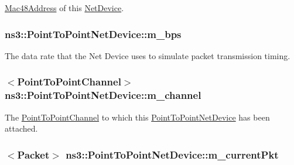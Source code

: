 \hyperlink{classns3_1_1Mac48Address}{Mac48\+Address} of this \hyperlink{classns3_1_1NetDevice}{Net\+Device}. 

\subsubsection[{\texorpdfstring{m\+\_\+bps}{m_bps}}]{ ns3\+::\+Point\+To\+Point\+Net\+Device\+::m\+\_\+bps\hspace{0.3cm}{\ttfamily [private]}}\hypertarget{classns3_1_1PointToPointNetDevice_a188a0f39b73b58cd7b61e008ad72d5f7}{}\label{classns3_1_1PointToPointNetDevice_a188a0f39b73b58cd7b61e008ad72d5f7}
The data rate that the Net Device uses to simulate packet transmission timing. 
\subsubsection[{\texorpdfstring{m\+\_\+channel}{m_channel}}]{$<${\bf Point\+To\+Point\+Channel}$>$ ns3\+::\+Point\+To\+Point\+Net\+Device\+::m\+\_\+channel\hspace{0.3cm}{\ttfamily [private]}}\hypertarget{classns3_1_1PointToPointNetDevice_a1792fcbe4da3c93ed8aaa2dcc1914029}{}\label{classns3_1_1PointToPointNetDevice_a1792fcbe4da3c93ed8aaa2dcc1914029}
The \hyperlink{classns3_1_1PointToPointChannel}{Point\+To\+Point\+Channel} to which this \hyperlink{classns3_1_1PointToPointNetDevice}{Point\+To\+Point\+Net\+Device} has been attached. 
\subsubsection[{\texorpdfstring{m\+\_\+current\+Pkt}{m_currentPkt}}]{$<${\bf Packet}$>$ ns3\+::\+Point\+To\+Point\+Net\+Device\+::m\+\_\+current\+Pkt\hspace{0.3cm}{\ttfamily [private]}}\hypertarget{classns3_1_1PointToPointNetDevice_abfddd3ae8f730f2f81360d926d40a78b}{}\label{classns3_1_1PointToPointNetDevice_abfddd3ae8f730f2f81360d926d40a78b}


